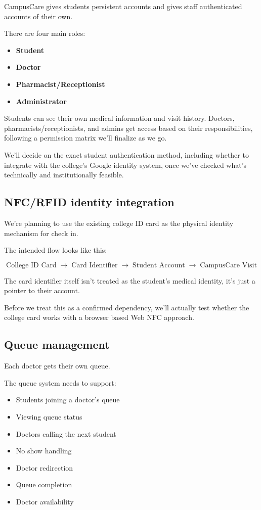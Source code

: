 \documentclass[11pt,a4paper]{article}
\begin{document}
CampusCare gives students persistent accounts and gives staff authenticated accounts of their own.

There are four main roles:

\begin{itemize}
    \item \textbf{Student}
    \item \textbf{Doctor}
    \item \textbf{Pharmacist/Receptionist}
    \item \textbf{Administrator}
\end{itemize}

Students can see their own medical information and visit history. Doctors, pharmacists/receptionists, and admins get access based on their responsibilities, following a permission matrix we'll finalize as we go.

We'll decide on the exact student authentication method, including whether to integrate with the college's Google identity system, once we've checked what's technically and institutionally feasible.

\subsection{NFC/RFID identity integration}

We're planning to use the existing college ID card as the physical identity mechanism for check in.

The intended flow looks like this:

\[
\text{College ID Card}
\;\rightarrow\;
\text{Card Identifier}
\;\rightarrow\;
\text{Student Account}
\;\rightarrow\;
\text{CampusCare Visit}
\]

The card identifier itself isn't treated as the student's medical identity, it's just a pointer to their account.

Before we treat this as a confirmed dependency, we'll actually test whether the college card works with a browser based Web NFC approach.

\subsection{Queue management}

Each doctor gets their own queue.

The queue system needs to support:

\begin{itemize}
    \item Students joining a doctor's queue
    \item Viewing queue status
    \item Doctors calling the next student
    \item No show handling
    \item Doctor redirection
    \item Queue completion
    \item Doctor availability
\end{itemize}
\end{document}
